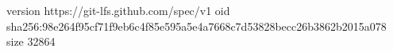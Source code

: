 version https://git-lfs.github.com/spec/v1
oid sha256:98e264f95cf71f9eb6c4f85e595a5e4a7668c7d53828becc26b3862b2015a078
size 32864
